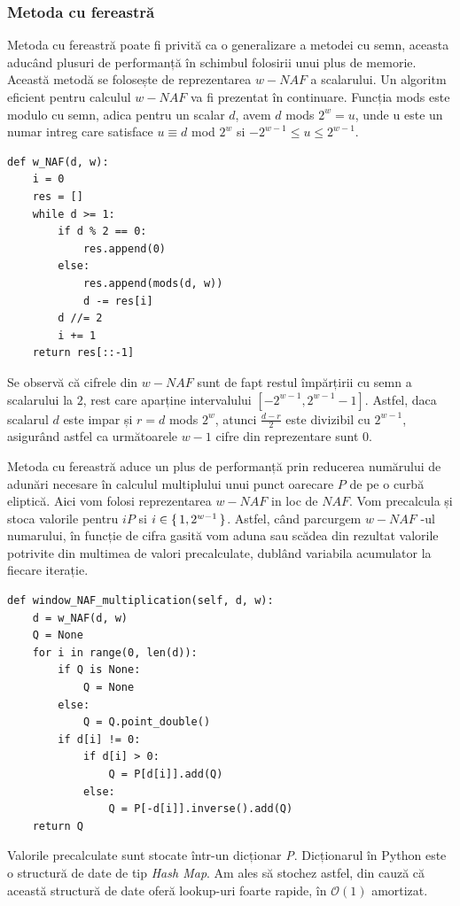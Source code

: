 \subsubsection{Metoda cu fereastră}

Metoda cu fereastră poate fi privită ca o generalizare a metodei cu semn, aceasta aducând plusuri de performanță în schimbul folosirii unui plus de memorie. Această metodă se folosește de reprezentarea $w-NAF$ a scalarului.
Un algoritm eficient pentru calculul $w-NAF$ va fi prezentat în continuare. Funcția mods este modulo cu semn, adica pentru un scalar $d$, avem $d$ mods $2^w=u$, unde u este un numar intreg care satisface $u\equiv d$ mod $2^w$ si $-2^{w-1}\leq u\leq 2^{w-1}$.

\begin{lstlisting}
def w_NAF(d, w):
    i = 0
    res = []
    while d >= 1:
        if d % 2 == 0:
            res.append(0)
        else:
            res.append(mods(d, w))
            d -= res[i]
        d //= 2
        i += 1
    return res[::-1]
\end{lstlisting}

Se observă că cifrele din $w-NAF$ sunt de fapt restul împărțirii cu semn a scalarului la $2$, rest care aparține intervalului $[-2^{w-1}, 2^{w-1}-1]$. Astfel, daca scalarul $d$ este impar și $r = d$ mods $2^w$, atunci $\frac{d-r}{2}$ este divizibil cu $2^{w-1}$, asigurând astfel ca următoarele $w-1$ cifre din reprezentare sunt $0$.
 
Metoda cu fereastră aduce un plus de performanță prin reducerea numărului de adunări necesare în calculul multiplului unui punct oarecare $P$ de pe o curbă eliptică. Aici vom folosi reprezentarea $w-NAF$ in loc de $NAF$. Vom precalcula și stoca valorile pentru $iP$ si $i\in\set{1, 2^{w-1}}$. Astfel, când parcurgem $w-NAF$ -ul numarului, în funcție de cifra gasită vom aduna sau scădea din rezultat valorile potrivite din multimea de valori precalculate, dublând variabila acumulator la fiecare iterație.

\begin{lstlisting}
def window_NAF_multiplication(self, d, w):
    d = w_NAF(d, w)
    Q = None
    for i in range(0, len(d)):
        if Q is None:
            Q = None
        else:
            Q = Q.point_double()
        if d[i] != 0:
            if d[i] > 0:
                Q = P[d[i]].add(Q)
            else:
                Q = P[-d[i]].inverse().add(Q)
    return Q
\end{lstlisting}

Valorile precalculate sunt stocate într-un dicționar \textit{P}. Dicționarul în Python este o structură de date de tip \textit{Hash Map}. Am ales să stochez astfel, din cauză că această structură de date oferă lookup-uri foarte rapide, în $\mathcal{O}(1)$ amortizat.

